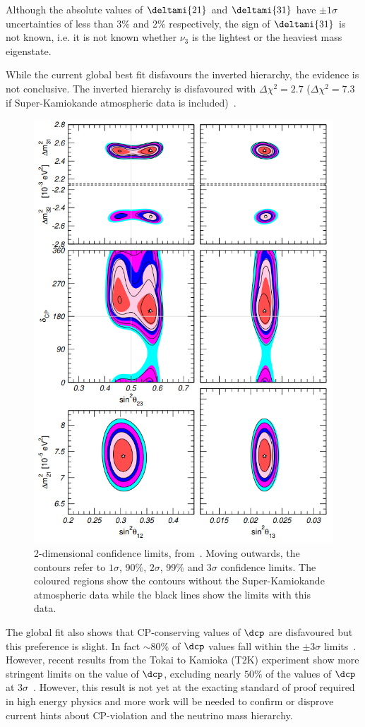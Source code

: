 Although the absolute values of $\deltami{21}$ and $\deltami{31}$ have $\pm1\sigma$ uncertainties of less than 3\% and 2\% respectively, the sign of $\deltami{31}$ is not known, i.e. it is not known whether $\nu_{3}$ is the lightest or the heaviest mass eigenstate.

While the current global best fit disfavours the inverted hierarchy, the evidence is not conclusive.
The inverted hierarchy is disfavoured with $\Delta \chi^{2}=2.7$ ($\Delta \chi^{2}=7.3$ if Super-Kamiokande atmospheric data is included)~\cite{nufit5}.

\begin{figure}[h]
  \centering
  \includegraphics[width=.75\linewidth]{files/figures/theory/nufit5Contours}
  \caption[Global 2-dimensional limits on oscillation parameters.]{2-dimensional confidence limits, from~\cite{nufit5}. Moving outwards, the contours refer to $1\sigma$, 90\%, $2\sigma$, 99\% and $3\sigma$ confidence limits. The coloured regions show the contours without the Super-Kamiokande atmospheric data while the black lines show the limits with this data.}
  \label{fig:nufit5Contours}
\end{figure}

The global fit also shows that CP-conserving values of $\dcp$ are disfavoured but this preference is slight.
In fact $\sim80\%$ of $\dcp$ values fall within the $\pm3\sigma$ limits~\cite{nufit5}.
However, recent results from the Tokai to Kamioka (T2K) experiment show more stringent limits on the value of $\dcp$, excluding nearly $50\%$ of the values of $\dcp$ at $3\sigma$~\cite{t2kRecent}.
However, this result is not yet at the exacting standard of proof required in high energy physics and more work will be needed to confirm or disprove current hints about CP-violation and the neutrino mass hierarchy.

